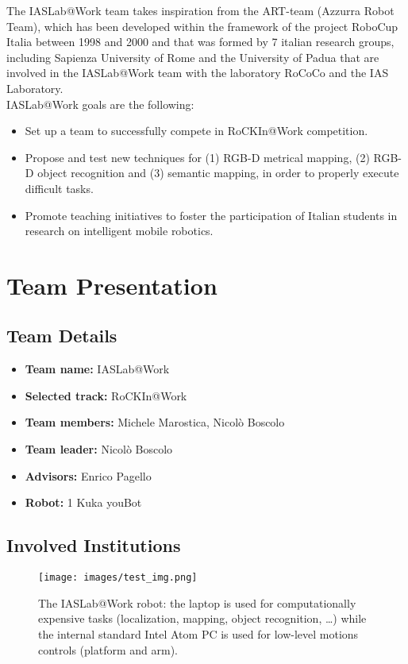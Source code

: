 \documentclass[conference]{IEEEtran}
\begin{document}
The IASLab@Work team takes inspiration from the ART-team (Azzurra Robot Team), which has been developed within the framework of the project RoboCup Italia between 1998 and 2000 and that was formed by 7 italian research groups, including Sapienza University of Rome and the University of Padua that are involved in the IASLab@Work team with the laboratory RoCoCo and the IAS Laboratory.\\ 

IASLab@Work goals are the following:
\begin{itemize}
 \item Set up a team to successfully compete in RoCKIn@Work competition.
 \item Propose and test new techniques for (1) RGB-D metrical mapping, (2) RGB-D object recognition and (3) semantic mapping, in order to properly execute difficult tasks.
 \item Promote teaching initiatives to foster the participation of Italian students in research on intelligent mobile robotics.
\end{itemize}
 
\section{Team Presentation}
\subsection{Team Details}

\begin{itemize}
 \item \textbf{Team name:} IASLab@Work
 \item \textbf{Selected track:} RoCKIn@Work
 \item \textbf{Team members:} Michele Marostica, Nicolò Boscolo %
  \item \textbf{Team leader:} Nicolò Boscolo %
 \item \textbf{Advisors:} Enrico Pagello %
 \item \textbf{Robot:} 1 Kuka youBot
\end{itemize}

\subsection{Involved Institutions}
\begin{figure}[t!]
\begin{center}
\texttt{[image: images/test\_img.png]}
\end{center}
\caption{The IASLab@Work robot: the laptop is used for computationally expensive tasks (localization, mapping, object recognition, \dots) while the internal standard Intel Atom PC is used for low-level motions controls (platform and arm).}\label{fig:robot}
\end{figure}
\end{document}
